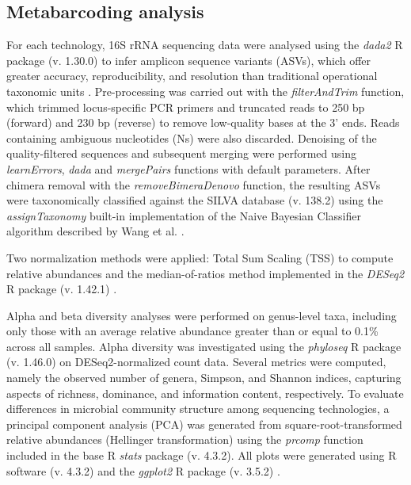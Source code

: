 \documentclass[12pt]{article}
\theoremstyle{thmstyleone}%
\theoremstyle{thmstyletwo}%
\theoremstyle{thmstylethree}%
\begin{document}
\subsection{Metabarcoding analysis}
For each technology, 16S rRNA sequencing data were analysed using the \textit{dada2} R package (v. 1.30.0) \citep{callahan2016dada2} to infer amplicon sequence variants (ASVs), which offer greater accuracy, reproducibility, and resolution than traditional operational taxonomic units \citep{10.1038/ismej.2017.119}. Pre-processing was carried out with the \textit{filterAndTrim} function, which trimmed locus-specific PCR primers and truncated reads to 250 bp (forward) and 230 bp (reverse) to remove low-quality bases at the 3’ ends. Reads containing ambiguous nucleotides (Ns) were also discarded. Denoising of the quality-filtered sequences and subsequent merging were performed using \textit{learnErrors}, \textit{dada} and \textit{mergePairs} functions with default parameters. After chimera removal with the \textit{removeBimeraDenovo} function, the resulting ASVs were taxonomically classified against the SILVA database (v. 138.2) \citep{10.1093/nar/gks1219,silva_genus_dada2} using the \textit{assignTaxonomy} built-in implementation of the Naive Bayesian Classifier algorithm described by Wang et al.  \citep{doi:10.1128/AEM.00062-07}. %

Two normalization methods were applied: Total Sum Scaling (TSS) to compute relative abundances and the median-of-ratios method implemented in the \textit{DESeq2} R package (v. 1.42.1) \citep{PMID:25516281}.

Alpha and beta diversity analyses were performed on genus-level taxa, including only those with an average relative abundance greater than or equal to 0.1\% across all samples. Alpha diversity was investigated using the \textit{phyloseq} R package (v. 1.46.0) \citep{mcmurdie2013phyloseq} on DESeq2-normalized count data. Several metrics were computed, namely the observed number of genera, Simpson, and Shannon indices, capturing aspects of richness, dominance, and information content, respectively. To evaluate differences in microbial community structure among sequencing technologies, a principal component analysis (PCA) was generated from square-root-transformed relative abundances (Hellinger transformation) using the \textit{prcomp} function included in the base R \textit{stats} package (v. 4.3.2). All plots were generated using R software (v. 4.3.2) \citep{R} and the \textit{ggplot2} R package (v. 3.5.2) \citep{ggplot2}. 
\end{document}
